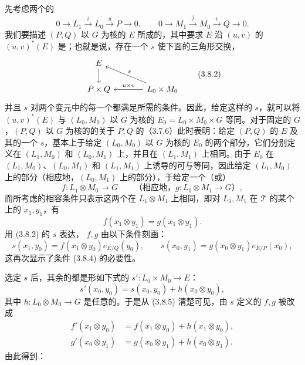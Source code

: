 先考虑两个的
\[
0\longrightarrow L_1\xrightarrow{i}L_0\xrightarrow{u}P\longrightarrow0,
\qquad0\longrightarrow M_1\xrightarrow{j}M_0\xrightarrow{v}Q\longrightarrow0.\tag{3.8.1}
\]
我们要描述 $(P,Q)$ 以 $G$ 为核的 $E$ 所成的，其中要求 $E$ 沿 $(u,v)$ 的 $(u,v)^*(E)$ 是；也就是说，存在一个 $s$ 使下面的三角形交换，
\[
\begin{tikzcd}[column sep=large]
E\arrow[d]&\\
P\times Q&L_0\times M_0\arrow[l,"u\times v"']\arrow[ul,"s"']
\end{tikzcd}\tag{3.8.2}
\]
并且 $s$ 对两个变元中的每一个都满足所需的条件。因此，给定这样的 $s$，就可以将 $(u,v)^*(E)$ 与 $(L_0,M_0)$ 以 $G$ 为核的 $E_0=L_0\times M_0\times G$ 等同。对于固定的 $G$，$(P,Q)$ 以 $G$ 为核的的关于 $P,Q$ 的（3.7.6）此时表明：给定 $(P,Q)$ 的 $E$ 及其的一个 $s$，基本上于给定 $(L_0,M_0)$ 以 $G$ 为核的 $E_0$ 的两个部分，它们分别定义在 $(L_1,M_0)$ 和 $(L_0,M_1)$ 上，并且在 $(L_1,M_1)$ 上相同。由于 $E_0$ 在 $(L_1,M_0)$、$(L_0,M_1)$ 和 $(L_1,M_1)$ 上诱导的可与等同，因此给定 $(L_1,M_0)$ 上的部分（相应地，$(L_0,M_1)$ 上的部分），于给定一个（或）
\[
f:L_1\otimes M_0\longrightarrow G
\qquad\text{（相应地，$g:L_0\otimes M_1\longrightarrow G$）},\tag{3.8.3}
\]
而所考虑的相容条件只表示这两个在 $L_1\otimes M_1$ 上相同，即对 $L_1,M_1$ 在 $\mathcal T$ 的某个上的 $x_1,y_1$，有
\[
f(x_1\otimes y_1)=g(x_1\otimes y_1).\tag{3.8.4}
\]
用 (3.8.2) 的 $s$ 表达， $f,g$ 由以下条件刻画：
\[
s(x_1,y_0)=f(x_1\otimes y_0)e_{E/Q}(y_0),\qquad
s(x_0,y_1)=g(x_0\otimes y_1)e_{E/P}(x_0),\tag{3.8.5}
\]
这再次显示了条件 (3.8.4) 的必要性。

选定 $s$ 后，其余的都是形如下式的 $s':L_0\times M_0\to E$：
\[
s'(x_0,y_0)=s(x_0,y_0)+h(x_0\otimes y_0),\tag{3.8.6}
\]
其中 $h:L_0\otimes M_0\to G$ 是任意的。于是从 (3.8.5) 清楚可见，由 $s$ 定义的 $f,g$ 被改成
\[
\begin{aligned}
f'(x_1\otimes y_0)&=f(x_1\otimes y_0)+h(x_1\otimes y_0),\\
g'(x_0\otimes y_1)&=g(x_0\otimes y_1)+h(x_0\otimes y_1).
\end{aligned}\tag{3.8.7}
\]
由此得到：

